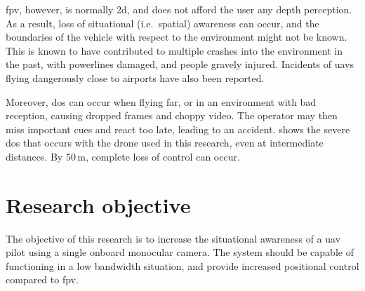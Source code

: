 \gls{fpv}, however, is normally \gls{2d}, and does not afford the user any depth perception.
As a result, loss of situational (i.e.\ spatial) awareness can occur, and the boundaries of the vehicle with respect to the environment might not be known.
This is known to have contributed to multiple crashes into the environment in the past, with powerlines damaged,\cite{latimes2015} and people gravely injured.\cite{seattletimes2015,bbcnews2015}
Incidents of \glspl{uav} flying dangerously close to airports have also been reported.\cite{ctvnews2014}

Moreover, \gls{dos} can occur when flying far, or in an environment with bad reception, causing dropped frames and choppy video.
The operator may then miss important cues and react too late, leading to an accident.
 shows the severe \gls{dos} that occurs with the drone used in this research, even at intermediate distances. By 50\,m, complete loss of control can occur.

\section{Research objective}
The objective of this research is to increase the situational awareness of a \gls{uav} pilot using a single onboard monocular camera.
The system should be capable of functioning in a low bandwidth situation, and provide increased positional control compared to \gls{fpv}.
